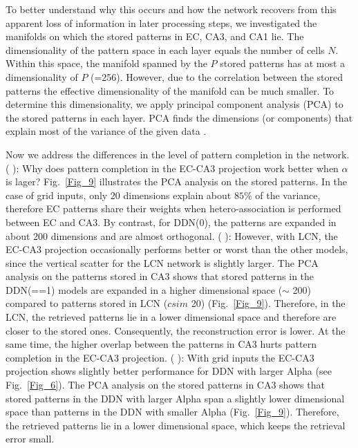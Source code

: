 \documentclass[utf8]{frontiersSCNS} %
\newcommand{\RN}[1]{%
  \textup{\uppercase\expandafter{\romannumeral#1}}%
}
\begin{document}
To better understand why this occurs and how the network recovers from this apparent loss of information in later processing steps, we investigated the manifolds on which the stored patterns in EC, CA3, and CA1 lie. The dimensionality of the pattern space in each layer equals the number of cells $N$. Within this space, the manifold spanned by the $P$ stored patterns has at most a dimensionality of $P$ (=256). However, due to the correlation between the stored patterns the effective dimensionality of the manifold can be much smaller. To determine this dimensionality, we apply principal component analysis (PCA) to the stored patterns in each layer. PCA finds the dimensions (or components) that explain most of the variance of the given data \cite[chapter 4]{Hastie2009}. 

Now we address the differences in the level of pattern completion in the network. (\RN{1}): Why does pattern completion in the EC-CA3 projection work better when $\alpha$ is lager? Fig.~\ref{Fig_9} illustrates the PCA analysis on the stored patterns. In the case of grid inputs, only 20 dimensions explain about $85 \%$ of the variance, therefore EC patterns share their weights when hetero-association is performed between EC and CA3. By contrast, for DDN(0), the patterns are expanded in about 200 dimensions and are almost orthogonal. (\RN{2}): 
However, with LCN, the EC-CA3 projection occasionally performs better or worst than the other models, since the vertical scatter for the LCN network is slightly larger. The PCA analysis on the patterns stored in CA3 shows that stored patterns in the DDN(==1) models are expanded in a higher dimensional space ($\sim$ 200) compared to patterns stored in LCN ($csim$ 20) (Fig.~\ref{Fig_9}). Therefore, in the LCN, the retrieved patterns lie in a lower dimensional space and therefore are closer to the stored ones. Consequently, the reconstruction error is lower. At the same time, the higher overlap between the patterns in CA3 hurts pattern completion in the EC-CA3 projection. (\RN{3}): With grid inputs the EC-CA3 projection shows slightly better performance for DDN with larger Alpha (see Fig.~\ref{Fig_6}). The PCA analysis on the stored patterns in CA3 shows that stored patterns in the DDN with larger Alpha span a slightly lower dimensional space than patterns in the DDN with smaller Alpha (Fig.~\ref{Fig_9}). Therefore, the retrieved patterns lie in a lower dimensional space, which keeps the retrieval error small.
\end{document}
